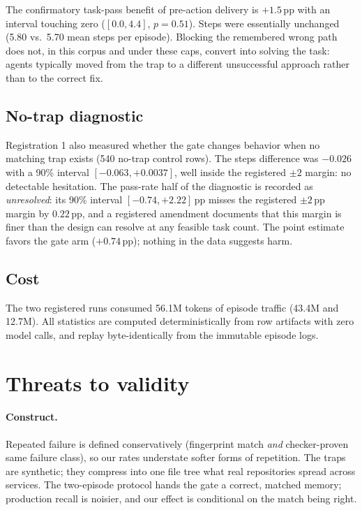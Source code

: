 \documentclass[11pt]{article}
\newcommand{\pp}{\ensuremath{\,\mathrm{pp}}}
\begin{document}
The confirmatory task-pass benefit of pre-action delivery is $+1.5\pp$ with
an interval touching zero ($[0.0, 4.4]$, $p = 0.51$). Steps were essentially
unchanged (5.80 vs.\ 5.70 mean steps per episode). Blocking the remembered
wrong path does not, in this corpus and under these caps, convert into
solving the task: agents typically moved from the trap to a different
unsuccessful approach rather than to the correct fix.

\subsection{No-trap diagnostic}
\label{sec:notrap}

Registration 1 also measured whether the gate changes behavior when no
matching trap exists (540 no-trap control rows). The steps difference was
$-0.026$ with a 90\% interval $[-0.063, +0.0037]$, well inside the
registered $\pm 2$ margin: no detectable hesitation. The pass-rate half of
the diagnostic is recorded as \emph{unresolved}: its 90\% interval
$[-0.74, +2.22]\pp$ misses the registered $\pm 2\pp$ margin by $0.22\pp$,
and a registered amendment documents that this margin is finer than the
design can resolve at any feasible task count. The point estimate favors the
gate arm ($+0.74\pp$); nothing in the data suggests harm.

\subsection{Cost}
\label{sec:cost}

The two registered runs consumed 56.1M tokens of episode traffic (43.4M and
12.7M). All statistics are computed deterministically from row artifacts
with zero model calls, and replay byte-identically from the immutable
episode logs.

\section{Threats to validity}
\label{sec:threats}

\paragraph{Construct.}
Repeated failure is defined conservatively (fingerprint match \emph{and}
checker-proven same failure class), so our rates understate softer forms of
repetition. The traps are synthetic; they compress into one file tree what
real repositories spread across services. The two-episode protocol hands the
gate a correct, matched memory; production recall is noisier, and our effect
is conditional on the match being right.
\end{document}
